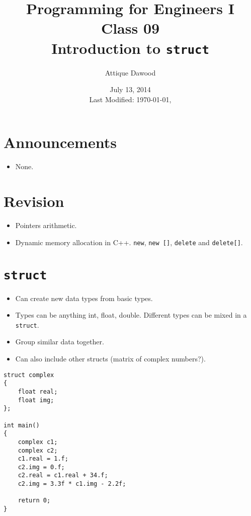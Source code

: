 \documentclass[12pt,a4paper]{article}
\title{Programming for Engineers I\\Class 09\\Introduction to \texttt{struct}}
\author{Attique Dawood}
\date{July 13, 2014\\[0.2cm] Last Modified: \today, \currenttime}
\begin{document}
\maketitle
\section{Announcements}
\begin{itemize}
\item None.
\end{itemize}
\section{Revision}
\begin{itemize}
\item Pointers arithmetic.
\item Dynamic memory allocation in C++. \verb|new|, \verb|new []|, \verb|delete| and \verb|delete[]|.
\end{itemize}
\section{\texttt{struct}}
\begin{itemize}
\item Can create new data types from basic types.
\item Types can be anything int, float, double. Different types can be mixed in a \texttt{struct}.
\item Group similar data together.
\item Can also include other structs (matrix of complex numbers?).
\end{itemize}
\begin{lstlisting}[caption={\texttt{struct}}]
struct complex
{
	float real;
	float img;
};

int main()
{
	complex c1;
	complex c2;
	c1.real = 1.f;
	c2.img = 0.f;
	c2.real = c1.real + 34.f;
	c2.img = 3.3f * c1.img - 2.2f;
	
	return 0;
}
\end{lstlisting}
\end{document}
